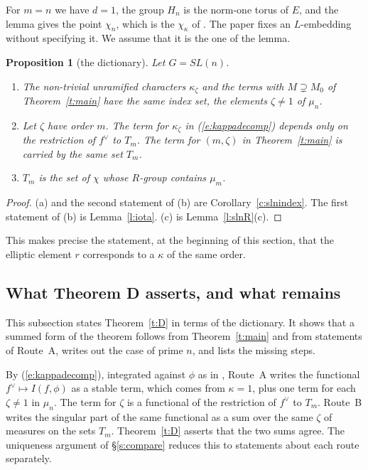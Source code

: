\documentclass[12pt,letterpaper]{article}
\numberwithin{equation}{section}
\theoremstyle{plain}
\newtheorem{proposition}[theorem]{Proposition}
\theoremstyle{definition}
\theoremstyle{remark}
\begin{document}
For $m=n$ we have $d=1$, the group $H_n$ is the norm-one torus of $E$, and the lemma gives the point $\chi_n$, which is the $\chi_\kappa$ of \cite[Prop.~5.1]{JC26}. The paper \cite{JC26} fixes an $L$-embedding without specifying it. We assume that it is the one of the lemma.

\begin{proposition}[the dictionary]\label{p:dictionary}
Let $G=SL(n)$.
\begin{enumerate}[label=(\alph*)]
\item The non-trivial unramified characters $\kappa_\zeta$ and the terms with $M\supsetneq M_0$ of Theorem~\ref{t:main} have the same index set, the elements $\zeta\ne1$ of $\mu_n$.
\item Let $\zeta$ have order $m$. The term for $\kappa_\zeta$ in (\ref{e:kappadecomp}) depends only on the restriction of $f^\vee$ to $T_m$. The term for $(m,\zeta)$ in Theorem~\ref{t:main} is carried by the same set $T_m$.
\item $T_m$ is the set of $\chi$ whose $R$-group contains $\mu_m$.
\end{enumerate}
\end{proposition}

\begin{proof}
(a) and the second statement of (b) are Corollary~\ref{c:slnindex}. The first statement of (b) is Lemma~\ref{l:iota}. (c) is Lemma~\ref{l:slnR}(c).
\end{proof}

This makes precise the statement, at the beginning of this section, that the elliptic element $r$ corresponds to a $\kappa$ of the same order.

\subsection{What Theorem D asserts, and what remains}\label{s:slnD}

This subsection states Theorem~\ref{t:D} in terms of the dictionary. It shows that a summed form of the theorem follows from Theorem~\ref{t:main} and from statements of Route~A, writes out the case of prime $n$, and lists the missing steps.

By (\ref{e:kappadecomp}), integrated against $\phi$ as in \cite[(4.11)]{JC26}, Route~A writes the functional $f^\vee\mapsto I(f,\phi)$ as a stable term, which comes from $\kappa=1$, plus one term for each $\zeta\ne1$ in $\mu_n$. The term for $\zeta$ is a functional of the restriction of $f^\vee$ to $T_m$. Route~B writes the singular part of the same functional as a sum over the same $\zeta$ of measures on the sets $T_m$. Theorem~\ref{t:D} asserts that the two sums agree. The uniqueness argument of \S\ref{s:compare} reduces this to statements about each route separately.
\end{document}
